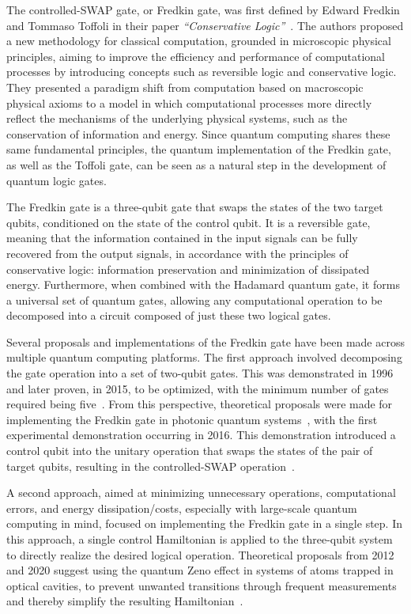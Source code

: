 The controlled-SWAP gate, or Fredkin gate, was first defined by Edward Fredkin and Tommaso Toffoli in their paper \emph{“Conservative Logic”}~\cite{Fredkin1982Conservative}. The authors proposed a new methodology for classical computation, grounded in microscopic physical principles, aiming to improve the efficiency and performance of computational processes by introducing concepts such as reversible logic and conservative logic. They presented a paradigm shift from computation based on macroscopic physical axioms to a model in which computational processes more directly reflect the mechanisms of the underlying physical systems, such as the conservation of information and energy. Since quantum computing shares these same fundamental principles, the quantum implementation of the Fredkin gate, as well as the Toffoli gate, can be seen as a natural step in the development of quantum logic gates.

The Fredkin gate is a three-qubit gate that swaps the states of the two target qubits, conditioned on the state of the control qubit. It is a reversible gate, meaning that the information contained in the input signals can be fully recovered from the output signals, in accordance with the principles of conservative logic: information preservation and minimization of dissipated energy. Furthermore, when combined with the Hadamard quantum gate, it forms a universal set of quantum gates, allowing any computational operation to be decomposed into a circuit composed of just these two logical gates.

Several proposals and implementations of the Fredkin gate have been made across multiple quantum computing platforms. The first approach involved decomposing the gate operation into a set of two-qubit gates. This was demonstrated in 1996 and later proven, in 2015, to be optimized, with the minimum number of gates required being five~\cite{smolin1996five, yu2015optimal}. From this perspective, theoretical proposals were made for implementing the Fredkin gate in photonic quantum systems~\cite{fiuravsek2006linear, gong2008methods}, with the first experimental demonstration occurring in 2016. This demonstration introduced a control qubit into the unitary operation that swaps the states of the pair of target qubits, resulting in the controlled-SWAP operation~\cite{patel2016quantumfredkin}.

A second approach, aimed at minimizing unnecessary operations, computational errors, and energy dissipation/costs, especially with large-scale quantum computing in mind, focused on implementing the Fredkin gate in a single step. In this approach, a single control Hamiltonian is applied to the three-qubit system to directly realize the desired logical operation. Theoretical proposals from 2012 and 2020 suggest using the quantum Zeno effect in systems of atoms trapped in optical cavities, to prevent unwanted transitions through frequent measurements and thereby simplify the resulting Hamiltonian~\cite{shi2012onestepimplementationfredkingate, Zhang2020FredkinPath}.

